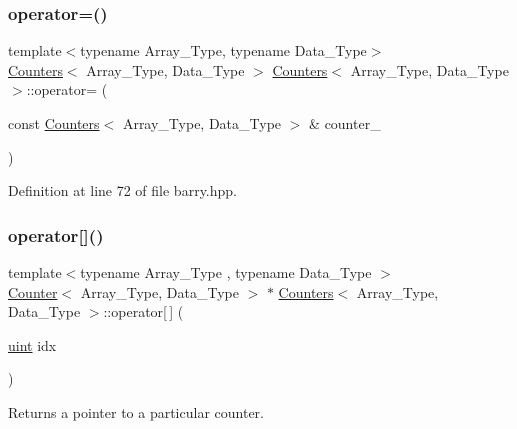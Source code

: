 \mbox{\label{classbarry_1_1_counters_a0edeb22b0b1640f7ada1ef47a30ac486}} 
\subsubsection{\texorpdfstring{operator=()}{operator=()}}
{\footnotesize\ttfamily template$<$typename Array\+\_\+\+Type, typename Data\+\_\+\+Type$>$ \\
\hyperlink{classbarry_1_1_counters}{Counters}$<$ Array\+\_\+\+Type, Data\+\_\+\+Type $>$ \hyperlink{classbarry_1_1_counters}{Counters}$<$ Array\+\_\+\+Type, Data\+\_\+\+Type $>$\+::operator= (\begin{DoxyParamCaption}\item[{const \hyperlink{classbarry_1_1_counters}{Counters}$<$ Array\+\_\+\+Type, Data\+\_\+\+Type $>$ \&}]{counter\+\_\+ }\end{DoxyParamCaption})}



Definition at line 72 of file barry.\+hpp.

\mbox{\label{classbarry_1_1_counters_a9c3ff72b5e24a299e3c1aecad0ea5eb2}} 
\subsubsection{\texorpdfstring{operator[]()}{operator[]()}}
{\footnotesize\ttfamily template$<$typename Array\+\_\+\+Type , typename Data\+\_\+\+Type $>$ \\
\hyperlink{classbarry_1_1_counter}{Counter}$<$ Array\+\_\+\+Type, Data\+\_\+\+Type $>$ $\ast$ \hyperlink{classbarry_1_1_counters}{Counters}$<$ Array\+\_\+\+Type, Data\+\_\+\+Type $>$\+::operator\mbox{[}$\,$\mbox{]} (\begin{DoxyParamCaption}\item[{\hyperlink{namespacebarry_a11dfc53ddb4672278319aa04f1e09a6c}{uint}}]{idx }\end{DoxyParamCaption})\hspace{0.3cm}{\ttfamily [inline]}}



Returns a pointer to a particular counter. 


